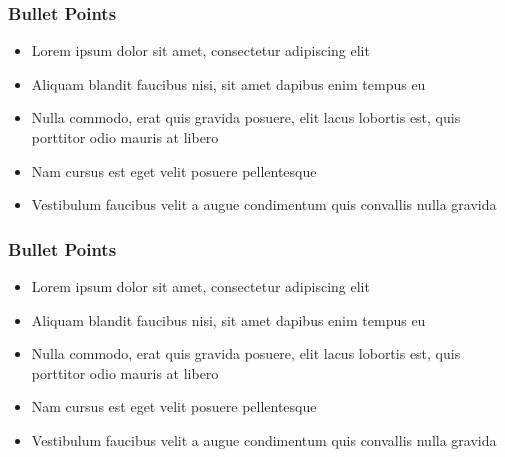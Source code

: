 % 
% 
% 
\begin{frame}
	\frametitle{Bullet Points}
	\begin{itemize}
	\item Lorem ipsum dolor sit amet, consectetur adipiscing elit
	\item Aliquam blandit faucibus nisi, sit amet dapibus enim tempus eu
	\item Nulla commodo, erat quis gravida posuere, elit lacus lobortis est, quis porttitor odio mauris at libero
	\item Nam cursus est eget velit posuere pellentesque
	\item Vestibulum faucibus velit a augue condimentum quis convallis nulla gravida
	\end{itemize}
\end{frame}
% 
% 
% 
% 
\begin{frame}
	\frametitle{Bullet Points}
	\begin{itemize}
	\item Lorem ipsum dolor sit amet, consectetur adipiscing elit
	\item Aliquam blandit faucibus nisi, sit amet dapibus enim tempus eu
	\item Nulla commodo, erat quis gravida posuere, elit lacus lobortis est, quis porttitor odio mauris at libero
	\item Nam cursus est eget velit posuere pellentesque
	\item Vestibulum faucibus velit a augue condimentum quis convallis nulla gravida
	\end{itemize}
\end{frame}
% 
% 

